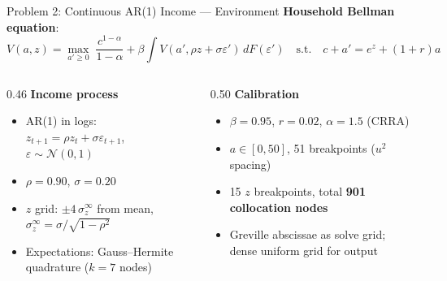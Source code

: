 \documentclass[aspectratio=169,11pt]{beamer}
\begin{document}
\begin{frame}{Problem 2: Continuous AR(1) Income --- Environment}
    \textbf{Household Bellman equation}:
    \[
    \boxed{
    V(a,z) = \max_{a'\ge 0}\; \frac{c^{1-\alpha}}{1-\alpha} + \beta \int V(a',\rho z + \sigma\varepsilon')\,dF(\varepsilon')
    \quad\text{s.t.}\quad c + a' = e^z + (1+r)a
    }
    \]

    \vspace{0.3em}
    \begin{columns}[T]
        \begin{column}{0.46\textwidth}
            \textbf{Income process}
            \begin{itemize}\setlength\itemsep{0.1em}
                \item AR(1) in logs: $z_{t+1} = \rho z_t + \sigma\varepsilon_{t+1}$, $\varepsilon\sim\mathcal{N}(0,1)$
                \item $\rho=0.90$, $\sigma=0.20$
                \item $z$ grid: $\pm 4\,\sigma_z^{\infty}$ from mean, $\sigma_z^\infty = \sigma/\sqrt{1-\rho^2}$
                \item Expectations: Gauss--Hermite quadrature ($k=7$ nodes)
            \end{itemize}
        \end{column}
        \begin{column}{0.50\textwidth}
            \textbf{Calibration}
            \begin{itemize}\setlength\itemsep{0.1em}
                \item $\beta=0.95$, $r=0.02$, $\alpha=1.5$ (CRRA)
                \item $a \in [0,50]$, 51 breakpoints ($u^2$ spacing)
                \item 15 $z$ breakpoints, total \textbf{901 collocation nodes}
                \item Greville abscissae as solve grid; dense uniform grid for output
            \end{itemize}
        \end{column}
    \end{columns}
\end{frame}
\end{document}
